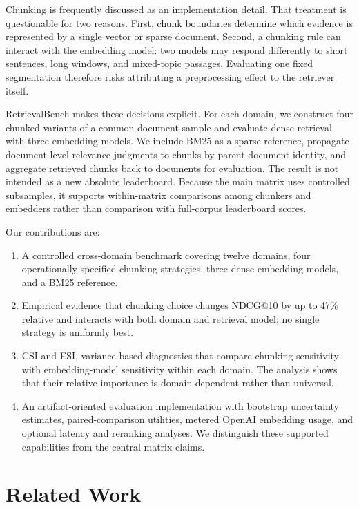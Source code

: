 \documentclass[10pt,letterpaper]{article}
\begin{document}
Chunking is frequently discussed as an implementation detail. That treatment is questionable for
two reasons. First, chunk boundaries determine which evidence is represented by a single vector or
sparse document. Second, a chunking rule can interact with the embedding model: two models may
respond differently to short sentences, long windows, and mixed-topic passages. Evaluating one
fixed segmentation therefore risks attributing a preprocessing effect to the retriever itself.

RetrievalBench makes these decisions explicit. For each domain, we construct four chunked
variants of a common document sample and evaluate dense retrieval with three embedding models.
We include BM25 as a sparse reference, propagate document-level relevance judgments to chunks by
parent-document identity, and aggregate retrieved chunks back to documents for evaluation. The
result is not intended as a new absolute leaderboard. Because the main matrix uses controlled
subsamples, it supports within-matrix comparisons among chunkers and embedders rather than
comparison with full-corpus leaderboard scores.

Our contributions are:
\begin{enumerate}
    \item A controlled cross-domain benchmark covering twelve domains, four operationally
    specified chunking strategies, three dense embedding models, and a BM25 reference.
    \item Empirical evidence that chunking choice changes NDCG@10 by up to 47\% relative and
    interacts with both domain and retrieval model; no single strategy is uniformly best.
    \item CSI and ESI, variance-based diagnostics that compare chunking sensitivity with
    embedding-model sensitivity within each domain. The analysis shows that their relative
    importance is domain-dependent rather than universal.
    \item An artifact-oriented evaluation implementation with bootstrap uncertainty estimates,
    paired-comparison utilities, metered OpenAI embedding usage, and optional latency and
    reranking analyses. We distinguish these supported capabilities from the central matrix claims.
\end{enumerate}

\section{Related Work}
\end{document}
